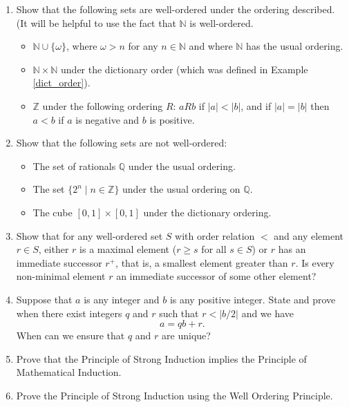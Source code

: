 \begin{enumerate}
\item Show that the following sets are well-ordered under the ordering described. (It will be helpful to use the fact that $\mathbb{N}$ is well-ordered.
	\begin{itemize}
		\item $\mathbb{N} \cup \{\omega\}$, where $\omega > n$ for any $n \in \mathbb{N}$ and where $\mathbb{N}$ has the usual ordering.
		\item $\mathbb{N} \times \mathbb{N}$ under the dictionary order (which was defined in Example \ref{dict_order}). 
		\item $\mathbb{Z}$ under the following ordering $R$: $aRb$ if $|a| < |b|$, and if $|a| = |b|$ then $a < b$ if $a$ is negative and $b$ is positive.
	\end{itemize}
	
\item Show that the following sets are not well-ordered:
	\begin{itemize}
		\item The set of rationals $\mathbb{Q}$ under the usual ordering.
		\item The set $\{2^n \mid n \in \mathbb{Z}\}$ under the usual ordering on $\mathbb{Q}$.
		\item The cube $[0, 1] \times [0, 1]$ under the dictionary ordering.
	\end{itemize}
	
\item Show that for any well-ordered set $S$ with order relation $<$ and any element $r \in S$, either $r$ is a maximal element ($r \geq s$ for all $s \in S$) or $r$ has an immediate successor $r^{+}$, that is, a smallest element greater than $r$. Is every non-minimal element $r$ an immediate successor of some other element?

\item Suppose that $a$ is any integer and $b$ is any positive integer. State and prove when there exist integers $q$ and $r$ such that $r < |b/2|$ and we have 
\[a = qb + r.\]
When can we ensure that $q$ and $r$ are unique?

\item Prove that the Principle of Strong Induction implies the Principle of Mathematical Induction.

\item Prove the Principle of Strong Induction using the Well Ordering Principle.


\end{enumerate}
